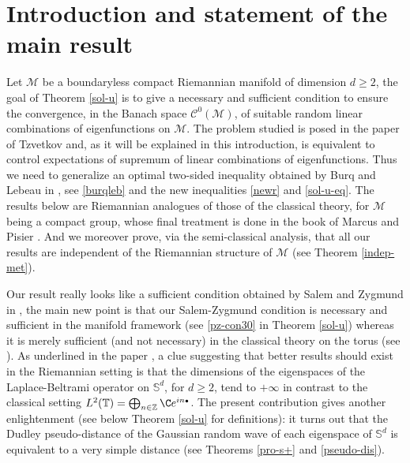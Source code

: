 \documentclass[JEP,XML,SOM,Unicode,NoEqCountersInSection,published]{cedram}
\newcommand{\sbullet}{{\scriptscriptstyle\bullet}}
\theoremstyle{theorem}
\theoremstyle{definition}
\newcommand\Z{\mathbb{Z}}
\newcommand\CC{\mathcal{C}}
\newcommand\bbS{\mathbb{S}}
\begin{document}
\maketitle
\vspace*{-\baselineskip}
\tableofcontents
\mainmatter

\vspace*{-3\baselineskip}\mbox{}
\section{Introduction and statement of the main result}
Let $\mathcal{M}$ be a boundaryless compact Riemannian manifold of dimension $d\geq 2$, the goal of Theorem \ref{sol-u} is to give a necessary and sufficient condition to ensure the convergence, in the Banach space $\CC^0(\mathcal{M})$, of suitable random linear combinations of eigenfunctions on $\mathcal{M}$. The problem studied is posed in the paper of Tzvetkov \cite[p.\,XV]{Tzvetkov4} and, as it will be explained in this introduction, is equivalent to control expectations of supremum of linear combinations of eigenfunctions. Thus we need to generalize an optimal two-sided inequality obtained by Burq and Lebeau in \cite{burq-lebeau,burq-lebeau2}, see \eqref{burqleb} and the new inequalities \eqref{newr} and \eqref{sol-u-eq}.
The results below are Riemannian analogues of those of the classical theory, for $\mathcal{M}$ being a compact group, whose final treatment is done in the book of Marcus and Pisier \cite{pisier1981}. And we moreover prove, via the semi-classical analysis, that all our results are independent of the Riemannian structure of $\mathcal{M}$ (see Theorem \ref{indep-met}).%

Our result really looks like a sufficient condition obtained by Salem and Zygmund in \cite[p.\,291]{salem1954}, the main new point is that our Salem-Zygmund condition is necessary and sufficient in the manifold framework (see \eqref{pz-con30} in Theorem \ref{sol-u}) whereas it is merely sufficient (and not necessary) in the classical theory on the torus (see \cite[p.\,292]{salem1954}). As underlined in the paper \cite{burq-lebeau}, a clue suggesting that better results should exist in the Riemannian setting is that the dimensions of the eigenspaces of the Laplace-Beltrami operator on $\bbS^d$, for $d\geq 2$, tend to $+\infty$ in contrast to the classical setting $L^2(\mathbb{T})=\bigoplus_{n\in \Z} \C e^{in\sbullet}$. The present contribution gives another enlightenment (see \hbox{below} Theorem \ref{sol-u} for definitions): it turns out that the Dudley pseudo-distance of the Gaussian random wave of each eigenspace of $\bbS^d$ is equivalent to a very simple distance (see Theorems \ref{pro-s+} and \ref{pseudo-dis}).
\end{document}
